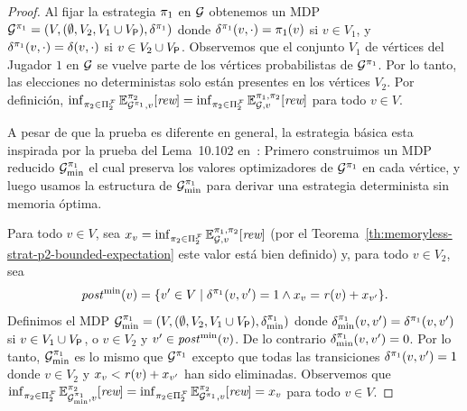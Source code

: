 \begin{proof}
  Al fijar la estrategia $\pi_{1}$ en $\mathcal{G}$ obtenemos un MDP
  $\mathcal{G}^{\pi_{1}} = (V, (\emptyset,V_2,V_1\cup V_{\mathsf{P}}),\delta^{\pi_{1}})$
  donde $\delta^{\pi_{1}}(v,\cdot)=\pi_{1}(v)$ si $v\in V_1$, y
  $\delta^{\pi_{1}}(v,\cdot)=\delta(v,\cdot)$ si $v\in V_2\cup V_{\mathsf{P}}$.
  Observemos que el conjunto $V_1$ de vértices del Jugador $1$ en $\mathcal{G}$ se vuelve
  parte de los vértices probabilistas de $\mathcal{G}^{\pi_{1}}$.  Por lo tanto,
  las elecciones no deterministas solo están presentes en los vértices  $V_2$.
  Por definición,
  $\inf_{\pi_{2} \in \Pi^{\mathcal{F}}_{2}} \mathbb{E}^{\pi_{2}}_{\mathcal{G}^{\pi_{1}},v}[\textit{rew}] =
  \inf_{\pi_{2} \in \Pi^{\mathcal{F}}_{2}} \mathbb{E}^{\pi_{1}, \pi_{2}}_{\mathcal{G},v}[\textit{rew}]$
  para todo $v\in V$.

  A pesar de que la prueba es diferente en general, la estrategia básica esta inspirada por la prueba del Lema~10.102 en~\cite{BaierK08}: Primero construimos
  un MDP reducido $\mathcal{G}^{\pi_{1}}_{\min}$ el cual preserva los valores optimizadores de $\mathcal{G}^{\pi_{1}}$ en cada vértice, y luego usamos la estructura de $\mathcal{G}^{\pi_{1}}_{\min}$ para derivar una estrategia determinista sin memoria óptima.

  Para todo $v\in V$,
  sea $x_v = \inf_{\pi_{2} \in \Pi^{\mathcal{F}}_{2}} \mathbb{E}^{\pi_{1}, \pi_{2}}_{\mathcal{G},v}[\textit{rew}]$
  (por el Teorema~\ref{th:memoryless-strat-p2-bounded-expectation} este valor está bien definido) y,
  para todo $v\in V_2$, sea
  \begin{equation}\label{th:infima-in-dmf-def-postmin}
 	\mathit{post}^{\min}(v) = \{{v'\in V} \mid {\delta^{\pi_{1}}(v,v')=1} \land {x_v=\mathit{r}(v)+x_{v'}}\}.
  \end{equation}
  Definimos el MDP
  $\mathcal{G}^{\pi_{1}}_{\min} = (V, (\emptyset,V_2,V_1\cup V_{\mathsf{P}}),\delta^{\pi_{1}}_{\min})$
  donde $\delta^{\pi_{1}}_{\min}(v,v')=\delta^{\pi_{1}}(v,v')$ si $v\in V_1\cup
  V_{\mathsf{P}}$, o $v\in V_2$ y $v'\in\mathit{post}^{\min}(v)$. De lo contrario
  $\delta^{\pi_{1}}_{\min}(v,v')=0$.
  Por lo tanto, $\mathcal{G}^{\pi_{1}}_{\min}$ es lo mismo que $\mathcal{G}^{\pi_{1}}$ excepto que todas las transiciones $\delta^{\pi_{1}}(v,v')=1$ donde $v\in V_2$ y
  $x_v < \mathit{r}(v)+x_{v'}$ han sido eliminadas.
  Observemos que
  $\inf_{\pi_{2} \in \Pi^{\mathcal{F}}_{2}} \mathbb{E}^{\pi_{2}}_{\mathcal{G}^{\pi_{1}}_{\min},v}[\textit{rew}] =
  \inf_{\pi_{2} \in \Pi^{\mathcal{F}}_{2}} \mathbb{E}^{\pi_{2}}_{\mathcal{G}^{\pi_{1}},v}[\textit{rew}] =
  x_v$
  para todo $v\in V$.


\end{proof}
